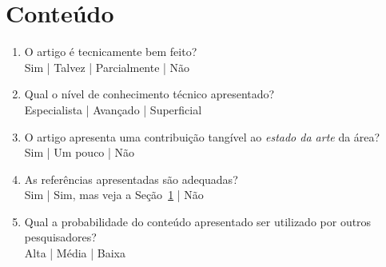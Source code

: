\documentclass{UnBExam}%
\begin{document}
	\section{Conteúdo}%
	\begin{enumerate}
		\item O artigo é tecnicamente bem feito?\\%
		Sim | Talvez | Parcialmente | Não

		\item Qual o nível de conhecimento técnico apresentado?\\%
		Especialista | Avançado | Superficial

		\item O artigo apresenta uma contribuição tangível ao \emph{estado da
		arte} da área?\\%
		Sim | Um pouco | Não

		\item As referências apresentadas são adequadas?\\%
		Sim | Sim, mas veja a Seção~\ref{} | Não

		\item Qual a probabilidade do conteúdo apresentado ser utilizado por
		outros pesquisadores?\\%
		Alta | Média | Baixa
	\end{enumerate}%

\end{document}
